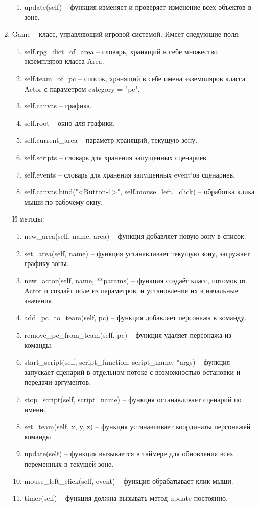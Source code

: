 \begin{enumerate}
\begin{enumerate}
			\item update(self) -- функция изменяет и проверяет изменение всех объектов в зоне.
		\end{enumerate}
	\item Game -- класс, управляющий игровой системой. Имеет следующие поля:
		\begin{enumerate}
			\item self.rpg\_dict\_of\_area -- словарь, хранящий в себе множество экземпляров класса Area.
			\item self.team\_of\_pc -- список, хранящий в себе имена экземпляров класса Actor с параметром category = "pc".
			\item self.canvas -- графика.
			\item self.root -- окно для графики.
			\item self.current\_area -- параметр хранящий, текущую зону.
			\item self.scripts -- словарь для хранения запущенных сценариев.
			\item self.events -- словарь для хранения запущенных event`ов сценариев.
			\item self.canvas.bind("<Button-1>", self.mouse\_left.\_click) -- обработка клика мыши по рабочему окну.
		\end{enumerate}
		И методы:
		\begin{enumerate}
			\item new\_area(self, name, area) -- функция добавляет новую зону в список.
			\item set\_area(self, name) -- функция устанавливает текущую зону, загружает графику зоны.
			\item new\_actor(self, name, **params) -- функция создаёт класс, потомок от Actor и создаёт поле из параметров, и установление их в начальные значения.
			\item add\_pc\_to\_team(self, pc) -- функция добавляет персонажа в команду.
			\item remove\_pc\_from\_team(self, pc) -- функция удаляет персонажа из команды.
			\item start\_script(self, script\_function, script\_name, *args) -- функция запускает сценарий в отдельном потоке с возможностью остановки и передачи аргументов.
			\item stop\_script(self, script\_name) -- функция останавливает сценарий по имени.
			\item set\_team(self, x, y, z) -- функция устанавливает координаты персонажей команды.
			\item update(self) -- функция вызывается в таймере для обновления всех переменных в текущей зоне.
			\item mouse\_left\_click(self, event) -- функция обрабатывает клик мыши.
			\item timer(self) -- функция должна вызывать метод update постоянно.
		\end{enumerate}
\end{enumerate}
